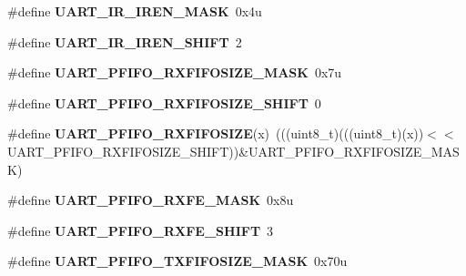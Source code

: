 \begin{DoxyCompactItemize}
\item 
\#define {\bfseries U\+A\+R\+T\+\_\+\+I\+R\+\_\+\+I\+R\+E\+N\+\_\+\+M\+A\+SK}~0x4u\hypertarget{group__UART__Register__Masks_gafb25f2545b505763066c9f30ff7447f0}{}\label{group__UART__Register__Masks_gafb25f2545b505763066c9f30ff7447f0}

\item 
\#define {\bfseries U\+A\+R\+T\+\_\+\+I\+R\+\_\+\+I\+R\+E\+N\+\_\+\+S\+H\+I\+FT}~2\hypertarget{group__UART__Register__Masks_ga674f392636537dcd6dd92309bead60b9}{}\label{group__UART__Register__Masks_ga674f392636537dcd6dd92309bead60b9}

\item 
\#define {\bfseries U\+A\+R\+T\+\_\+\+P\+F\+I\+F\+O\+\_\+\+R\+X\+F\+I\+F\+O\+S\+I\+Z\+E\+\_\+\+M\+A\+SK}~0x7u\hypertarget{group__UART__Register__Masks_gaf6314eec454a532d9baf2eff4ea61204}{}\label{group__UART__Register__Masks_gaf6314eec454a532d9baf2eff4ea61204}

\item 
\#define {\bfseries U\+A\+R\+T\+\_\+\+P\+F\+I\+F\+O\+\_\+\+R\+X\+F\+I\+F\+O\+S\+I\+Z\+E\+\_\+\+S\+H\+I\+FT}~0\hypertarget{group__UART__Register__Masks_gae4811b6796cb32adc0f9d172e9748e75}{}\label{group__UART__Register__Masks_gae4811b6796cb32adc0f9d172e9748e75}

\item 
\#define {\bfseries U\+A\+R\+T\+\_\+\+P\+F\+I\+F\+O\+\_\+\+R\+X\+F\+I\+F\+O\+S\+I\+ZE}(x)~(((uint8\+\_\+t)(((uint8\+\_\+t)(x))$<$$<$U\+A\+R\+T\+\_\+\+P\+F\+I\+F\+O\+\_\+\+R\+X\+F\+I\+F\+O\+S\+I\+Z\+E\+\_\+\+S\+H\+I\+FT))\&U\+A\+R\+T\+\_\+\+P\+F\+I\+F\+O\+\_\+\+R\+X\+F\+I\+F\+O\+S\+I\+Z\+E\+\_\+\+M\+A\+SK)\hypertarget{group__UART__Register__Masks_gae66abbd658a1f8eb533f5b5eee9e5c98}{}\label{group__UART__Register__Masks_gae66abbd658a1f8eb533f5b5eee9e5c98}

\item 
\#define {\bfseries U\+A\+R\+T\+\_\+\+P\+F\+I\+F\+O\+\_\+\+R\+X\+F\+E\+\_\+\+M\+A\+SK}~0x8u\hypertarget{group__UART__Register__Masks_ga307298b76c15ac932486f994b3afc1b2}{}\label{group__UART__Register__Masks_ga307298b76c15ac932486f994b3afc1b2}

\item 
\#define {\bfseries U\+A\+R\+T\+\_\+\+P\+F\+I\+F\+O\+\_\+\+R\+X\+F\+E\+\_\+\+S\+H\+I\+FT}~3\hypertarget{group__UART__Register__Masks_gae2a3c9994dc6da5a2955ac8c274bdaaf}{}\label{group__UART__Register__Masks_gae2a3c9994dc6da5a2955ac8c274bdaaf}

\item 
\#define {\bfseries U\+A\+R\+T\+\_\+\+P\+F\+I\+F\+O\+\_\+\+T\+X\+F\+I\+F\+O\+S\+I\+Z\+E\+\_\+\+M\+A\+SK}~0x70u\hypertarget{group__UART__Register__Masks_ga61eb610888ac018061d20a755264292a}{}\label{group__UART__Register__Masks_ga61eb610888ac018061d20a755264292a}


\end{DoxyCompactItemize}
